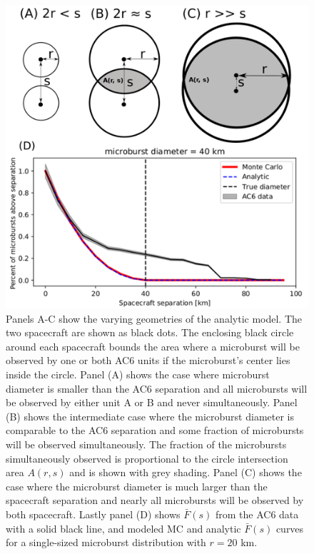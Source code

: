\documentclass[draft]{agujournal2019}
\begin{document}
\begin{figure}
\includegraphics[width=\textwidth]{fig5.png}
\caption{Panels A-C show the varying geometries of the analytic model. The two spacecraft are shown as black dots. The enclosing black circle around each spacecraft bounds the area where a microburst will be observed by one or both AC6 units if the microburst's center lies inside the circle. Panel (A) shows the case where microburst diameter is smaller than the AC6 separation and all microbursts will be observed by either unit A or B and never simultaneously. Panel (B) shows the intermediate case where the microburst diameter is comparable to the AC6 separation and some fraction of microbursts will be observed simultaneously. The fraction of the microbursts simultaneously observed is proportional to the circle intersection area $A(r, s)$ and is shown with grey shading. Panel (C) shows the case where the microburst diameter is much larger than the spacecraft separation and nearly all microbursts will be observed by both spacecraft. Lastly panel (D) shows $\bar{F}(s)$ from the AC6 data with a solid black line, and modeled MC and analytic $\bar{F}(s)$ curves for a single-sized microburst distribution with $r = 20$ km.} 
\label{fig5}
\end{figure}
\end{document}
